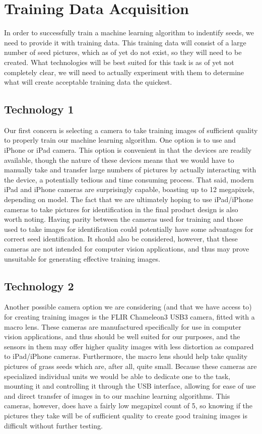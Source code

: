 \documentclass[onecolumn, draftclsnofoot,10pt, compsoc]{IEEEtran}
\begin{document}
\section{Training Data Acquisition}
In order to successfully train a machine learning algorithm to indentify seeds, we need to provide it with training data.
This training data will consist of a large number of seed pictures, which as of yet do not exist, so they will need to be created.
What technologies will be best suited for this task is as of yet not completely clear, we will need to actually experiment with them to determine what will create acceptable training data the quickest.


\subsection{Technology 1}
Our first concern is selecting a camera to take training images of sufficient quality to properly train our machine learning algorithm.
One option is to use and iPhone or iPad camera.
This option is convenient in that the devices are readily available, though the nature of these devices means that we would have to manually take and transfer large numbers of pictures by actually interacting with the device, a potentially tedious and time consuming process.
That said, modern iPad and iPhone cameras are surprisingly capable, boasting up to 12 megapixels, depending on model.
The fact that we are ultimately hoping to use iPad/iPhone cameras to take pictures for identification in the final product design is also worth noting.
Having parity between the cameras used for training and those used to take images for identification could potentially have some advantages for correct seed identification.
It should also be considered, however, that these cameras are not intended for computer vision applications, and thus may prove unsuitable for generating effective training images.

\subsection{Technology 2}
Another possible camera option we are considering (and that we have access to) for creating training images is the FLIR Chameleon3 USB3 camera, fitted with a macro lens.
These cameras are manufactured specifically for use in computer vision applications, and thus should be well suited for our purposes, and the sensors in them may offer higher quality images with less distortion as compared to iPad/iPhone cameras.
Furthermore, the macro lens should help take quality pictures of grass seeds which are, after all, quite small.
Because these cameras are specialized individual units we would be able to dedicate one to the task, mounting it and controlling it through the USB interface, allowing for ease of use and direct transfer of images in to our machine learning algorithms.
This cameras, however, does have a fairly low megapixel count of 5, so knowing if the pictures they take will be of sufficient quality to create good training images is difficult without further testing.
\end{document}
